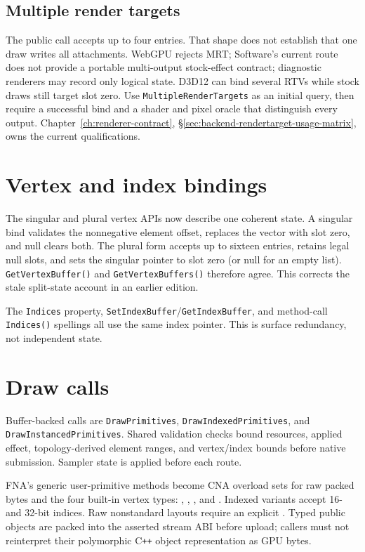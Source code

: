 \subsection{Multiple render targets}
\label{sec:worked-mrt}

The public call accepts up to four  entries. That shape does not
establish that one draw writes all attachments. WebGPU rejects MRT; Software's current route does
not provide a portable multi-output stock-effect contract; diagnostic renderers may record only
logical state. D3D12 can bind several RTVs while stock draws still target slot zero. Use
\texttt{MultipleRenderTargets} as an initial query, then require a successful bind and a shader
and pixel oracle that distinguish every output. Chapter~\ref{ch:renderer-contract},
\S\ref{sec:backend-rendertarget-usage-matrix}, owns the current qualifications.

\section{Vertex and index bindings}
\label{sec:vertex-index-binding}

The singular and plural vertex APIs now describe one coherent state. A singular bind validates
the nonnegative element offset, replaces the vector with slot zero, and null clears both. The
plural form accepts up to sixteen entries, retains legal null slots, and sets the singular pointer
to slot zero (or null for an empty list). \texttt{GetVertexBuffer()} and
\texttt{GetVertexBuffers()} therefore agree. This corrects the stale split-state account in an
earlier edition.

The \texttt{Indices} property, \texttt{SetIndexBuffer}/\texttt{GetIndexBuffer}, and method-call
\texttt{Indices()} spellings all use the same index pointer. This is surface redundancy, not
independent state.

\section{Draw calls}
\label{sec:draw-calls}

Buffer-backed calls are \texttt{DrawPrimitives}, \texttt{DrawIndexedPrimitives}, and
\texttt{DrawInstancedPrimitives}. Shared validation checks bound resources, applied effect,
topology-derived element ranges, and vertex/index bounds before native submission. Sampler state
is applied before each route.

FNA's generic user-primitive methods become CNA overload sets for raw packed bytes and the four
built-in vertex types: ,
, , and
. Indexed variants accept 16- and 32-bit indices. Raw
nonstandard layouts require an explicit . Typed public objects are
packed into the asserted stream ABI before upload; callers must not reinterpret their
polymorphic C\texttt{++} object representation as GPU bytes.

